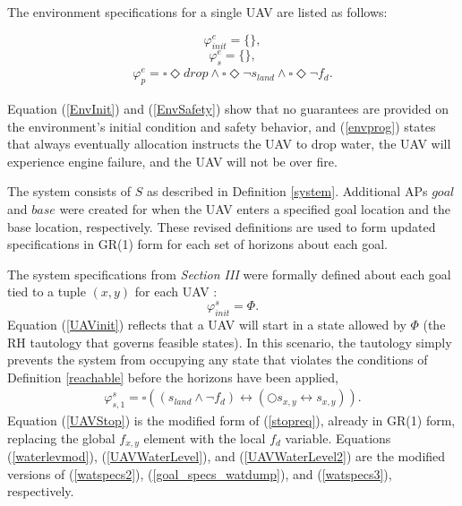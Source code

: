 \documentclass{ieeeaccess}
\newcommand{\always}{\square}
\newcommand{\eventually}{\Diamond}
\newcommand{\next}{\bigcirc}
\begin{document}
The environment specifications for a single UAV are listed as follows: 

\begin{equation}
\varphi_{init}^{e} = \{\},
\label{EnvInit}
\end{equation}
\begin{equation}
\varphi_{s}^{e} = \{\},
\label{EnvSafety}
\end{equation}
\begin{equation}
\begin{aligned}
\varphi_{p}^{e} = \always \eventually drop \land \always \eventually \lnot s_{land} \land \always \eventually \lnot f_d.
\end{aligned}
\label{envprog}
\end{equation}

Equation (\ref{EnvInit}) and (\ref{EnvSafety}) show that no guarantees are provided on the environment's initial condition and safety behavior, and (\ref{envprog}) states that always eventually allocation instructs the UAV to drop water, the UAV will experience engine failure, and the UAV will not be over fire.

The system consists of $S$ as described in Definition \ref{system}. Additional APs $goal$ and $base$ were created for when the UAV enters a specified goal location and the base location, respectively. These revised definitions are used to form updated specifications in GR(1) form for each set of horizons about each goal.

The system specifications from \textit{Section III} were formally defined about each goal tied to a tuple $(x,y)$ for each UAV :
\begin{equation}
\varphi_{init}^{s} = \Phi.
\label{UAVinit}
\end{equation}
Equation (\ref{UAVinit}) reflects that a UAV will start in a state allowed by $\Phi$ (the RH tautology that governs feasible states). In this scenario, the tautology simply prevents the system from occupying any state that violates the conditions of Definition \ref{reachable} before the horizons have been applied,
\begin{equation}
\begin{aligned}
\varphi_{s,1}^{s} = \always ((s_{land} \land \lnot f_d) \leftrightarrow (\next s_{x,y} \leftrightarrow s_{x,y})).
\end{aligned}
\label{UAVStop}
\end{equation}
Equation (\ref{UAVStop}) is the modified form of (\ref{stopreq}), already in GR(1) form, replacing the global $f_{x,y}$ element with the local $f_d$ variable. Equations (\ref{waterlevmod}), (\ref{UAVWaterLevel}), and (\ref{UAVWaterLevel2}) are the modified versions of (\ref{watspecs2}), (\ref{goal_specs_watdump}), and (\ref{watspecs3}), respectively. 
\end{document}
